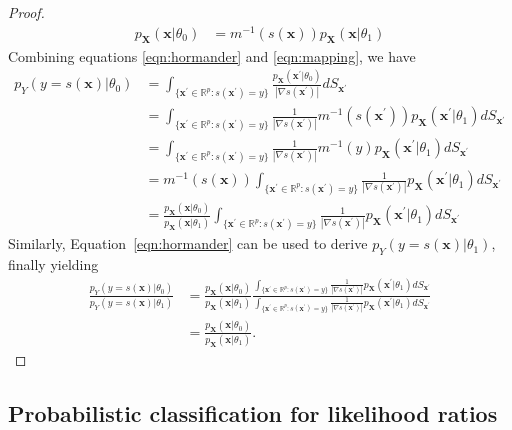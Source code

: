 \documentclass[12pt]{article}
\numberwithin{equation}{section}
\theoremstyle{plain}
\begin{document}
\begin{proof}
\begin{align}
p_\mathbf{X}(\mathbf{x}|\theta_0) &= m^{-1}(s(\mathbf{x})) p_\mathbf{X}(\mathbf{x}|\theta_1) \label{eqn:mapping}
\end{align}
Combining equations \ref{eqn:hormander} and \ref{eqn:mapping}, we have
\begin{align}
p_Y(y=s(\mathbf{x})|\theta_0) &= \int_{\{\mathbf{x}^\prime \in \mathbb{R}^p : s(\mathbf{x}^\prime) = y\}} \frac{p_\mathbf{X}(\mathbf{x}^\prime|\theta_0)}{|\nabla s(\mathbf{x}^\prime)|} dS_{\mathbf{x}^\prime} \nonumber \\
&= \int_{\{\mathbf{x}^\prime \in \mathbb{R}^p : s(\mathbf{x}^\prime) = y\}}  \frac{1}{|\nabla s(\mathbf{x}^\prime)|} m^{-1}(s(\mathbf{x}^\prime)) p_\mathbf{X}(\mathbf{x}^\prime|\theta_1) dS_{\mathbf{x}^\prime} \nonumber \\
&= \int_{\{\mathbf{x}^\prime \in \mathbb{R}^p : s(\mathbf{x}^\prime) = y\}}  \frac{1}{|\nabla s(\mathbf{x}^\prime)|} m^{-1}(y) p_\mathbf{X}(\mathbf{x}^\prime|\theta_1) dS_{\mathbf{x}^\prime} \nonumber \\
&= m^{-1}(s(\mathbf{x})) \int_{\{\mathbf{x}^\prime \in \mathbb{R}^p : s(\mathbf{x}^\prime) = y\}}  \frac{1}{|\nabla s(\mathbf{x}^\prime)|}  p_\mathbf{X}(\mathbf{x}^\prime|\theta_1) dS_{\mathbf{x}^\prime} \nonumber \\
&= \frac{p_\mathbf{X}(\mathbf{x}|\theta_0)}{p_\mathbf{X}(\mathbf{x}|\theta_1)} \int_{\{\mathbf{x}^\prime \in \mathbb{R}^p : s(\mathbf{x}^\prime) = y\}}  \frac{1}{|\nabla s(\mathbf{x}^\prime)|}  p_\mathbf{X}(\mathbf{x}^\prime|\theta_1) dS_{\mathbf{x}^\prime}
\end{align}
Similarly, Equation~\ref{eqn:hormander} can be used to derive $p_Y(y=s(\mathbf{x})|\theta_1)$, finally yielding
\begin{align}
\frac{p_Y(y=s(\mathbf{x})|\theta_0)}{p_Y(y=s(\mathbf{x})|\theta_1)} &= \frac{p_\mathbf{X}(\mathbf{x}|\theta_0)}{p_\mathbf{X}(\mathbf{x}|\theta_1)} \frac{\int_{\{\mathbf{x}^\prime \in \mathbb{R}^p : s(\mathbf{x}^\prime) = y\}}  \frac{1}{|\nabla s(\mathbf{x}^\prime)|}  p_\mathbf{X}(\mathbf{x}^\prime|\theta_1) dS_{\mathbf{x}^\prime}}{ \int_{\{\mathbf{x}^\prime \in \mathbb{R}^p : s(\mathbf{x}^\prime) = y\}}  \frac{1}{|\nabla s(\mathbf{x}^\prime)|}  p_\mathbf{X}(\mathbf{x}^\prime|\theta_1) dS_{\mathbf{x}^\prime} } \nonumber \\
&= \frac{p_\mathbf{X}(\mathbf{x}|\theta_0)}{p_\mathbf{X}(\mathbf{x}|\theta_1)}.
\end{align}
\end{proof}

\subsection{Probabilistic classification for likelihood ratios}
\label{sec:clf-for-ratios}
\end{document}
